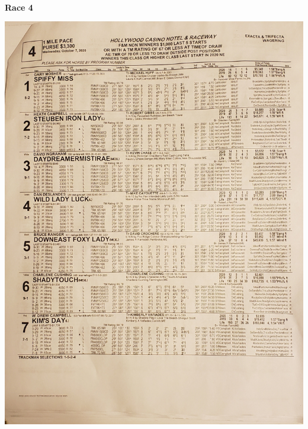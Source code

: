 \documentclass{article}
\begin{document}
\begin{center}
\small{~\\}
\textbf{\LARGE{\textcolor[rgb]{0,0,0}{Race 4 }}}\\
\begin{turn}{0}
\includegraphics[scale=0.12]{race04.jpg}
\end{turn}
\end{center}
\end{document}
